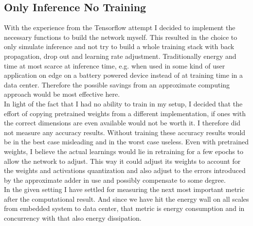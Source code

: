 \documentclass[]{IEEEtran}
\begin{document}
\subsection{Only Inference No Training}
With the experience from the Tensorflow attempt I decided to implement the necessary functions to build the network myself. This resulted in the choice to only simulate inference and not try to build a whole training stack with back propagation, drop out and learning rate adjustment. Traditionally energy and time at most scarce at inference time, e.g. when used in some kind of user application on edge on a battery powered device instead of at training time in a data center. Therefore the possible savings from an approximate computing approach would be most effective here. \\
In light of the fact that I had no ability to train in my setup, I decided that the effort of copying pretrained weights from a different implementation, if ones with the correct dimensions are even available would not be worth it. I therefore did not measure any accuracy results. Without training these accuracy results would be in the best case misleading and in the worst case useless. Even with pretrained weights, I believe the actual learnings would lie in retraining for a few epochs to allow the network to adjust. This way it could adjust its weights to account for the weights and activations quantization and also adjust to the errors introduced by the approximate adder in use and possibly compensate to some degree. \\
In the given setting I have settled for measuring the next most important metric after the computational result. And since we have hit the energy wall on all scales from embedded system to data center, that metric is energy consumption and in concurrency with that also energy dissipation.
\end{document}
